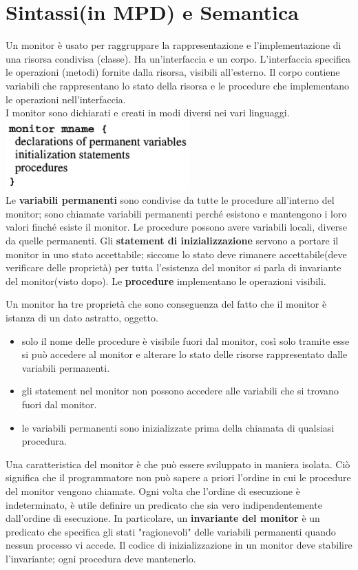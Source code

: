 \documentclass[10pt,a4paper]{book}
\begin{document}
\section{Sintassi(in MPD) e Semantica}
Un monitor è usato per raggruppare la rappresentazione e l'implementazione di una risorsa condivisa (classe). Ha un'interfaccia e un corpo. L'interfaccia specifica le operazioni (metodi) fornite dalla risorsa, visibili all'esterno. Il corpo contiene variabili che rappresentano lo stato della risorsa e le procedure che implementano le operazioni nell'interfaccia.\\
I monitor sono dichiarati e creati in modi diversi nei vari linguaggi. \\
\includegraphics[scale=0.51]{img/monitor.png} \\
Le \textbf{variabili permanenti} sono condivise da tutte le procedure all'interno del monitor; sono chiamate variabili permanenti perché esistono e mantengono i loro valori finché esiste il monitor. Le procedure possono avere variabili locali, diverse da quelle permanenti.
Gli \textbf{statement di inizializzazione} servono a portare il monitor in uno stato accettabile; siccome lo stato deve rimanere accettabile(deve verificare delle proprietà) per tutta l'esistenza del monitor si parla di invariante del monitor(visto dopo).
Le \textbf{procedure} implementano le operazioni visibili.

Un monitor ha tre proprietà che sono conseguenza del fatto che il monitor è istanza di un dato astratto, oggetto.
\begin{itemize}
\item solo il nome delle procedure è visibile fuori dal monitor, così solo tramite esse si può accedere al monitor e alterare lo stato delle risorse rappresentato dalle variabili permanenti.
\item gli statement nel monitor non possono accedere alle variabili che si trovano fuori dal monitor.
\item le variabili permanenti sono inizializzate prima della chiamata di qualsiasi procedura.
\end{itemize}

Una caratteristica del monitor è che può essere sviluppato in maniera isolata. Ciò significa che il programmatore non può sapere a priori l'ordine in cui le procedure del monitor vengono chiamate. Ogni volta che l'ordine di esecuzione è indeterminato, è utile definire un predicato che sia vero indipendentemente dall'ordine di esecuzione. In particolare, un \textbf{invariante del monitor} è un predicato che specifica gli stati "ragionevoli" delle variabili permanenti quando nessun processo vi accede. Il codice di inizializzazione in un monitor deve stabilire l'invariante; ogni procedura deve mantenerlo.
\end{document}
